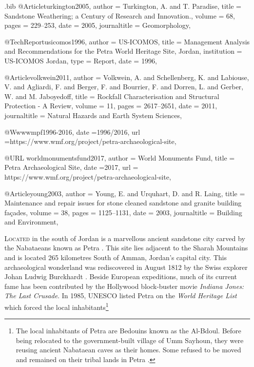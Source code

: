 \begin{filecontents}{\IJSRAidentifier.bib}
@Article{turkington2005,
  author       = {Turkington, A. and T. Paradise},
  title        = {Sandstone Weathering; a Century of Research and Innovation.},
  volume       = {68},
  pages        = {229--253},
  date         = {2005},
  journaltitle = {Geomorphology},
}

@TechReport{usicomos1996,
  author      = {US-ICOMOS},
  title       = {Management Analysis and Recommendations for the Petra World Heritage Site, Jordan},
  institution = {US-ICOMOS Jordan},
  type        = {Report},
  date        = {1996},
}

@Article{volkwein2011,
  author       = {Volkwein, A. and Schellenberg, K. and Labiouse, V. and Agliardi, F. and Berger, F. and Bourrier, F. and Dorren, L. and Gerber, W. and M. Jaboyedoff},
  title        = {Rockfall Characterisation and Structural Protection - A Review},
  volume       = {11},
  pages        = {2617--2651},
  date         = {2011},
  journaltitle = {Natural Hazards and Earth System Sciences},
}

@Www{wmpf1996-2016,
  date ={1996/2016},
  url  ={https://www.wmf.org/project/petra-archaeological-site},
}

@URL {worldmonumentsfund2017,
 author = {World Monuments Fund},
 title = {Petra Archaeological Site},
 date ={2017},
 url = {https://www.wmf.org/project/petra-archaeological-site},
}

@Article{young2003,
  author       = {Young, E. and Urquhart, D. and R. Laing},
  title        = {Maintenance and repair issues for stone cleaned sandstone and granite building façades},
  volume       = {38},
  pages        = {1125--1131},
  date         = {2003},
  journaltitle = {Building and Environment},
}

\end{filecontents}
\IJSRAopening%
\lettrine{L}{ocated}  in the south of Jordan is a marvellous ancient sandstone city carved by the Nabataeans known as Petra .
This site lies adjacent to the Sharah Mountains and is located \num{265} kilometres South of Amman, Jordan’s capital city.
This archaeological wonderland was rediscovered in August 1812 by the Swiss explorer Johan Ludwig Burckhardt \parencite[1--5]{harding1938}. Beside European expeditions, much of its current fame has been contributed by the Hollywood block-buster movie \emph{Indiana Jones: The Last Crusade}.
In 1985, UNESCO listed Petra on the \emph{World Heritage List} which forced the local inhabitants\footnote{The local inhabitants of Petra are Bedouins known as the Al-Bdoul. Before being relocated to the government-built village of Umm Sayhoun, they were reusing ancient Nabataean caves as their homes. Some refused to be moved and remained on their tribal lands in Petra \parencites[108--110]{bille2012}[139--140]{mckenzie1991}[89]{mustafa2011}.} 
